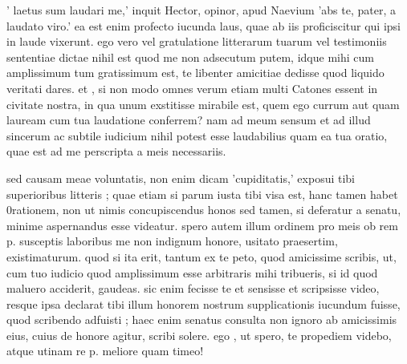 


 ' laetus sum laudari me,' inquit Hector, opinor, apud Naevium 'abs te, pater, a laudato viro.' ea est enim profecto iucunda laus, quae ab iis proficiscitur qui ipsi in laude vixerunt. ego vero vel gratulatione litterarum tuarum vel testimoniis sententiae dictae nihil est quod me non adsecutum putem, idque mihi cum amplissimum tum gratissimum est, te libenter amicitiae dedisse quod liquido veritati dares. et , si non modo omnes verum etiam multi Catones essent in civitate nostra, in qua unum exstitisse mirabile est, quem ego currum aut quam lauream cum tua laudatione conferrem? nam ad meum sensum et ad illud sincerum ac subtile iudicium nihil potest esse laudabilius quam ea tua oratio, quae est ad me perscripta a meis necessariis.

 sed causam meae voluntatis, non enim dicam 'cupiditatis,' exposui tibi superioribus litteris ; quae etiam si parum iusta tibi visa est, hanc tamen habet 0rationem, non ut nimis concupiscendus honos sed tamen, si deferatur a senatu, minime aspernandus esse videatur. spero autem illum ordinem pro meis ob rem p. susceptis laboribus me non indignum honore, usitato praesertim, existimaturum. quod si ita erit, tantum ex te peto, quod amicissime scribis, ut, cum tuo iudicio quod amplissimum esse arbitraris mihi tribueris, si id quod maluero acciderit, gaudeas. sic enim fecisse te et sensisse et scripsisse video, resque ipsa declarat tibi illum honorem nostrum supplicationis iucundum fuisse, quod scribendo adfuisti ; haec enim senatus consulta non ignoro ab amicissimis eius, cuius de honore agitur, scribi solere. ego , ut spero, te propediem videbo, atque utinam re p. meliore quam timeo!
